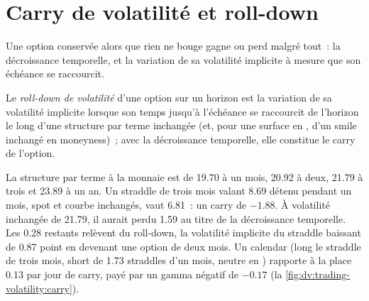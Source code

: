 \section{Carry de volatilité et roll-down}

Une option conservée alors que rien ne bouge gagne ou perd malgré tout~: la décroissance temporelle, et la variation de sa volatilité implicite à mesure que son échéance se raccourcit.

\begin{definition}\label{def:dv:trading-volatility:rolldown}
Le \emph{roll-down de volatilité} d'une option sur un horizon est la variation de sa volatilité implicite lorsque son temps
jusqu'à l'échéance se raccourcit de l'horizon le long d'une structure par terme inchangée (et, pour une surface en , d'un smile inchangé en moneyness)~; avec la
décroissance temporelle, elle constitue le carry de l'option.
\end{definition}

\begin{example}\label{ex:dv:trading-volatility:carry}
La structure par terme à la monnaie est de 19.70 à un mois, 20.92 à deux, 21.79 à trois et 23.89 à un an. Un straddle de trois mois valant 8.69
détenu pendant un mois, spot et courbe inchangés, vaut 6.81~: un carry de $-1.88$. À volatilité inchangée de 21.79, il aurait perdu 1.59 au titre de la
décroissance temporelle. Les 0.28 restants relèvent du roll-down, la volatilité implicite du straddle baissant de 0.87 point en devenant une option de deux mois. Un calendar (long
le straddle de trois mois, short de 1.73 straddles d'un mois, neutre en ) rapporte à la place 0.13 par jour de carry, payé par un gamma négatif de
$-0.17$ (la \cref{fig:dv:trading-volatility:carry}).
\end{example}


